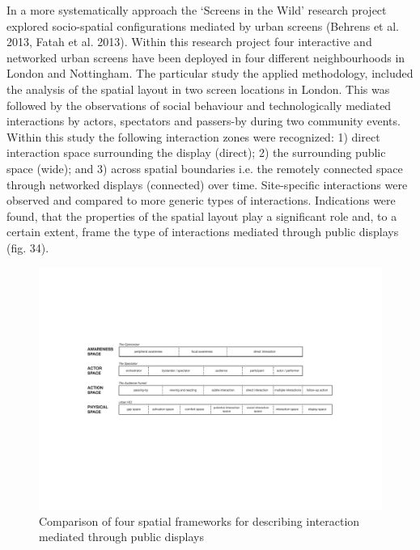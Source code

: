 In a more systematically approach the ‘Screens in the Wild’ research project explored socio-spatial configurations mediated by urban screens (Behrens et al. 2013, Fatah et al. 2013). Within this research project four interactive and networked urban screens have been deployed in four different neighbourhoods in London and Nottingham. The particular study the applied methodology, included the analysis of the spatial layout in two screen locations in London. This was followed by the observations of social behaviour and technologically mediated interactions by actors, spectators and passers-by during two community events. Within this study the following interaction zones were recognized: 1) direct interaction space surrounding the display (direct); 2) the surrounding public space (wide); and 3) across spatial boundaries i.e. the remotely connected space through networked displays (connected) over time. Site-specific interactions were observed and compared to more generic types of interactions. Indications were found, that the properties of the spatial layout play a significant role and, to a certain extent, frame the type of interactions mediated through public displays (fig. 34).


\begin{figure}[htp]
\centering
\includegraphics[width=\textwidth]{Illustrations/SpatialFrameworks_2.pdf}
\caption{Comparison of four spatial frameworks for describing interaction mediated through public
displays}
\label{fig:comparison}
\end{figure}


